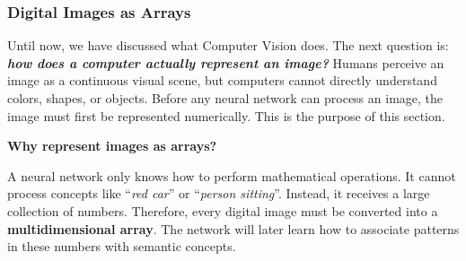 \subsubsection{Digital Images as Arrays}\label{sec:digital-images-as-arrays}

Until now, we have discussed what Computer Vision does. The next question is: \emph{\textbf{how does a computer actually represent an image?}} Humans perceive an image as a continuous visual scene, but computers cannot directly understand colors, shapes, or objects. Before any neural network can process an image, the image must first be represented numerically. This is the purpose of this section.

\highspace
\begin{flushleft}
    \textcolor{Green3}{ \textbf{Why represent images as arrays?}}
\end{flushleft}
A neural network only knows how to perform mathematical operations. It cannot process concepts like ``\emph{red car}'' or ``\emph{person sitting}''. Instead, it receives a large collection of numbers. Therefore, every digital image must be converted into a \textbf{multidimensional array}. The network will later learn how to associate patterns in these numbers with semantic concepts.

